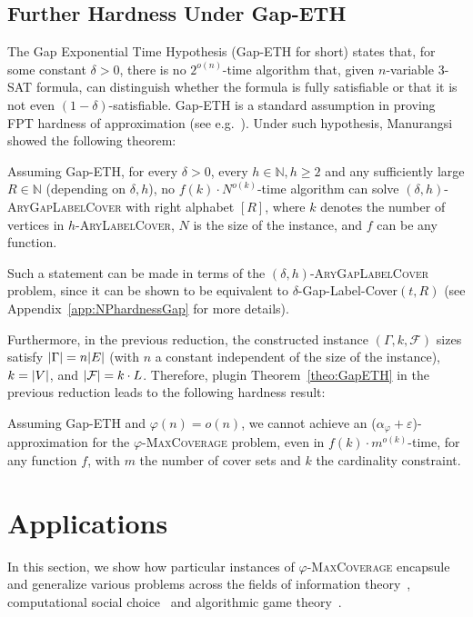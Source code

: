 \subsection{Further Hardness Under Gap-ETH}
  \label{section:GapETH}
  The Gap Exponential Time Hypothesis (Gap-ETH for short) states that, for some constant $\delta > 0$, there is no $2^{o(n)}$-time algorithm that, given $n$-variable $3$-SAT formula, can distinguish whether the formula is fully satisfiable or that it is not even $(1-\delta)$-satisfiable. Gap-ETH is a standard assumption in proving FPT hardness of approximation (see e.g.~\cite{CCKLMNT17}). Under such hypothesis, Manurangsi showed the following theorem:

  \begin{theorem}
    \label{theo:GapETH}
    Assuming Gap-ETH, for every $\delta > 0$, every $h \in \mathbb{N}, h \geq 2$ and any sufficiently large $R \in \mathbb{N}$ (depending on $\delta, h$), no $f(k) \cdot N^{o(k)}$-time algorithm can solve $(\delta,h)$-\textsc{AryGapLabelCover} with right alphabet $[R]$, where $k$ denotes the number of vertices in $h$-\textsc{AryLabelCover}, $N$ is the size of the instance, and $f$ can be any function.
  \end{theorem}

  Such a statement can be made in terms of the $(\delta,h)$-\textsc{AryGapLabelCover} problem, since it can be shown to be equivalent to $\delta$-Gap-Label-Cover$(t,R)$ (see Appendix~\ref{app:NPhardnessGap} for more details).

  Furthermore, in the previous reduction, the constructed instance $(\Gamma,k,\mathcal{F})$ sizes satisfy $\abs{\Gamma} = n\abs{E}$ (with $n$ a constant independent of the size of the instance), $k=\abs{V}$, and $\abs{\mathcal{F}} = k \cdot L$. Therefore, plugin Theorem~\ref{theo:GapETH} in the previous reduction leads to the following hardness result:

  \begin{theorem}
    \label{theo:GapHardness}
    Assuming Gap-ETH and $\varphi(n) = o(n)$, we cannot achieve an ($\alpha_{\varphi} + \varepsilon$)-approximation for the $\varphi$-\textsc{MaxCoverage} problem, even in $f(k) \cdot m^{o(k)}$-time, for any function $f$, with $m$ the number of cover sets and $k$ the cardinality constraint.
  \end{theorem}
  
\section{Applications}
\label{section:applications}
In this section, we show how particular instances of $\varphi$-\textsc{MaxCoverage} encapsule and generalize various problems across the fields of information theory~\cite{CT01}, computational social choice~\cite{BCE16} and algorithmic game theory~\cite{NRTV07}.


